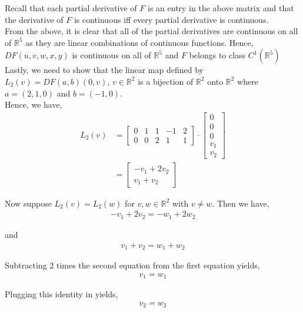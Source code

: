 \documentclass[12pt]{article}
\begin{document}
Recall that each partial derivative of $F$ is an entry in the above matrix and that the derivative of $F$ is continuous iff every partial derivative is continuous.\\

From the above, it is clear that all of the partial derivatives are continuous on all of $\mathbb{R}^5$ as they are linear combinations of continuous functions. Hence, $DF(u, v, w, x, y)$ is continuous on all of $\mathbb{R}^5$ and $F$ belongs to class $C^1(\mathbb{R}^5)$\\

Lastly, we need to show that the linear map defined by $L_2(v) = DF(a, b)(0, v)$, $v \in \mathbb{R}^2$ is a bijection of $\mathbb{R}^2$ onto $\mathbb{R}^2$ where $a = (2, 1, 0)$ and $b = (-1, 0)$.\\

Hence, we have,
\begin{align*}
L_2(v) &= \begin{bmatrix}
0 & 1 & 1 & -1 & 2\\
0 & 0 & 2 & 1 & 1
\end{bmatrix} \cdot \begin{bmatrix}
0 \\ 0 \\ 0 \\ v_1 \\ v_2
\end{bmatrix}\\
&= \begin{bmatrix}
-v_1 + 2v_2 \\
v_1 + v_2
\end{bmatrix}
\end{align*}

Now suppose $L_2(v) = L_2(w)$ for $v, w \in \mathbb{R}^2$ with $v \neq w$. Then we have,
\begin{align*}
-v_1 + 2v_2 = -w_1 + 2w_2
\end{align*}

and 
\begin{align*}
v_1 + v_2 = w_1 + w_2
\end{align*}

Subtracting $2$ times the second equation from the first equation yields,
\begin{align*}
v_1 = w_1
\end{align*}

Plugging this identity in yields,
\begin{align*}
v_2 = w_2
\end{align*}
\end{document}
